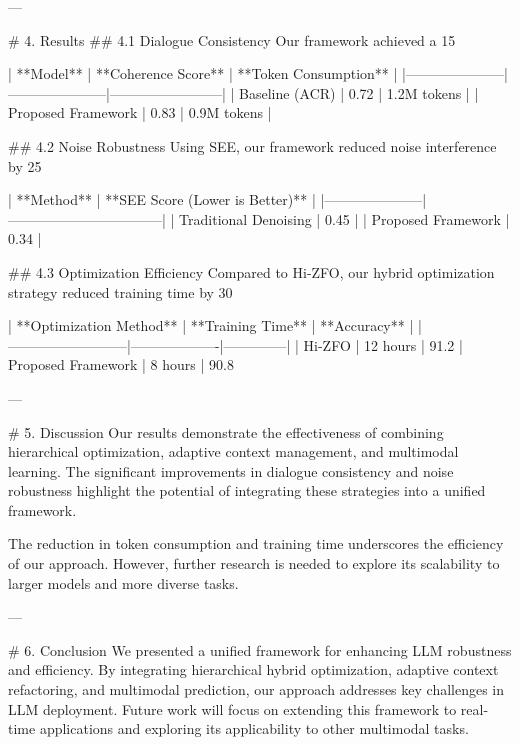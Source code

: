 ---

# 4. Results  
## 4.1 Dialogue Consistency  
Our framework achieved a 15%

| **Model**          | **Coherence Score** | **Token Consumption** |  
|---------------------|---------------------|------------------------|  
| Baseline (ACR)      | 0.72                | 1.2M tokens           |  
| Proposed Framework  | 0.83                | 0.9M tokens           |  

## 4.2 Noise Robustness  
Using SEE, our framework reduced noise interference by 25%

| **Method**          | **SEE Score (Lower is Better)** |  
|---------------------|---------------------------------|  
| Traditional Denoising | 0.45                          |  
| Proposed Framework   | 0.34                          |  

## 4.3 Optimization Efficiency  
Compared to Hi-ZFO, our hybrid optimization strategy reduced training time by 30%

| **Optimization Method** | **Training Time** | **Accuracy** |  
|--------------------------|-------------------|--------------|  
| Hi-ZFO                  | 12 hours          | 91.2%
| Proposed Framework      | 8 hours           | 90.8%

---

# 5. Discussion  
Our results demonstrate the effectiveness of combining hierarchical optimization, adaptive context management, and multimodal learning. The significant improvements in dialogue consistency and noise robustness highlight the potential of integrating these strategies into a unified framework.

The reduction in token consumption and training time underscores the efficiency of our approach. However, further research is needed to explore its scalability to larger models and more diverse tasks.

---

# 6. Conclusion  
We presented a unified framework for enhancing LLM robustness and efficiency. By integrating hierarchical hybrid optimization, adaptive context refactoring, and multimodal prediction, our approach addresses key challenges in LLM deployment. Future work will focus on extending this framework to real-time applications and exploring its applicability to other multimodal tasks.

